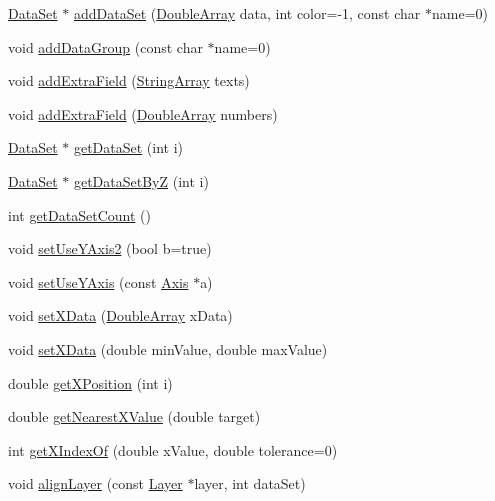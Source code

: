 \begin{DoxyCompactItemize}
\item 
\hyperlink{class_data_set}{Data\+Set} $\ast$ \hyperlink{class_layer_a1189f55e57ec73c1726cb8141c5daf17}{add\+Data\+Set} (\hyperlink{class_double_array}{Double\+Array} data, int color=-\/1, const char $\ast$name=0)
\item 
void \hyperlink{class_layer_af14282bdf56c0987e2bd1510fb83a9b4}{add\+Data\+Group} (const char $\ast$name=0)
\item 
void \hyperlink{class_layer_a6f22ae8bd97228303a91ad9efe6ea3da}{add\+Extra\+Field} (\hyperlink{class_string_array}{String\+Array} texts)
\item 
void \hyperlink{class_layer_a309be6ac81b9f7592697fa1ce4a86b71}{add\+Extra\+Field} (\hyperlink{class_double_array}{Double\+Array} numbers)
\item 
\hyperlink{class_data_set}{Data\+Set} $\ast$ \hyperlink{class_layer_a129db307a7eca2caec1337b22e013d54}{get\+Data\+Set} (int i)
\item 
\hyperlink{class_data_set}{Data\+Set} $\ast$ \hyperlink{class_layer_a27a86fcb9a2e6d782ccd8a9c5ea1bed7}{get\+Data\+Set\+ByZ} (int i)
\item 
int \hyperlink{class_layer_affe94b8f21f405ff17f9d83f86211db5}{get\+Data\+Set\+Count} ()
\item 
void \hyperlink{class_layer_ade6f7d6d3b8e9170301f87d5364480bc}{set\+Use\+Y\+Axis2} (bool b=true)
\item 
void \hyperlink{class_layer_a5085490db860509f067b0fe68a55fe0a}{set\+Use\+Y\+Axis} (const \hyperlink{class_axis}{Axis} $\ast$a)
\item 
void \hyperlink{class_layer_a6cc7d6e69afe7e9a9c33052f01546f80}{set\+X\+Data} (\hyperlink{class_double_array}{Double\+Array} x\+Data)
\item 
void \hyperlink{class_layer_a1556d7e58c43f25cf4ee0f7357121fbc}{set\+X\+Data} (double min\+Value, double max\+Value)
\item 
double \hyperlink{class_layer_a9366bceb749abf3702fe6cc83a436da1}{get\+X\+Position} (int i)
\item 
double \hyperlink{class_layer_aec99cc6d249936a4314f8388dc443b3d}{get\+Nearest\+X\+Value} (double target)
\item 
int \hyperlink{class_layer_a6d450eda89af1922a7223ee02e00af95}{get\+X\+Index\+Of} (double x\+Value, double tolerance=0)
\item 
void \hyperlink{class_layer_a359f31be37e9bedf43c6c7614042b5e0}{align\+Layer} (const \hyperlink{class_layer}{Layer} $\ast$layer, int data\+Set)
\item 

\end{DoxyCompactItemize}

